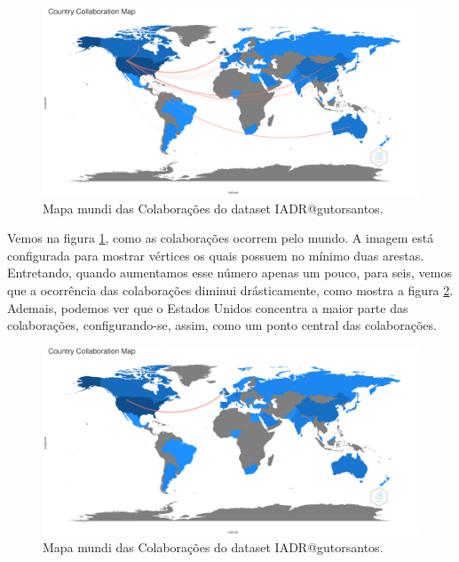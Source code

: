 \begin{figure}
    \centering
\includegraphics[angle=0,width=1\textwidth]{experiments/gutorsantos/AnaliseBibliometrica/IAeDiscriminacao/imgs/CountryCollaborationMap-2022-02-09.png}
    \caption{Mapa mundi das Colaborações do dataset IADR@gutorsantos.}
    \label{fig:IADR@gutorsantos:WorldMap}
\end{figure}

Vemos na figura \ref{fig:IADR@gutorsantos:WorldMap}, como as colaborações ocorrem pelo mundo. A imagem está configurada para mostrar vértices os quais possuem no mínimo duas arestas. Entretando, quando aumentamos esse número apenas um pouco, para seis, vemos que a ocorrência das colaborações diminui drásticamente, como mostra a figura \ref{fig:IADR@gutorsantos:WorldMap2}. Ademais, podemos ver que o Estados Unidos concentra a maior parte das colaborações, configurando-se, assim, como um ponto central das colaborações.


\begin{figure}
    \centering
\includegraphics[angle=0,width=1\textwidth]{experiments/gutorsantos/AnaliseBibliometrica/IAeDiscriminacao/imgs/CountryCollaborationMap-2022-02-09-param6.png}
    \caption{Mapa mundi das Colaborações do dataset IADR@gutorsantos.}
    \label{fig:IADR@gutorsantos:WorldMap2}
\end{figure}

